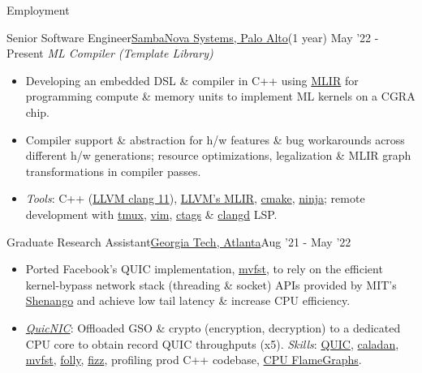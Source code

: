 \documentclass[]{mcdowellcv}
\begin{document}
    \makeheader

    \begin{cvsection}{Employment}
        \begin{cvsubsection}{Senior Software
          Engineer}{\href{https://sambanova.ai/}{SambaNova Systems, Palo
          Alto}}{(1 year) May '22 - Present}
            \textit{ML Compiler (Template Library)}
            \begin{itemize}
                \item Developing an embedded DSL \& compiler in C++ using
                  \href{https://mlir.llvm.org/}{MLIR} for programming compute
                  \& memory units to implement ML kernels on a CGRA chip.
                \item Compiler support \& abstraction for h/w features \& bug workarounds across different h/w generations; resource optimizations, legalization \& MLIR graph transformations in compiler passes.
                \item \textit{Tools}: C++ (\href{https://clang.llvm.org/}{LLVM clang 11}), \href{https://mlir.llvm.org/}{LLVM's MLIR}, \href{https://cmake.org/}{cmake}, \href{https://ninja-build.org/}{ninja};
                    remote development with \href{https://github.com/tmux/tmux}{tmux}, \href{https://www.vim.org/}{vim}, \href{https://github.com/universal-ctags/ctags}{ctags} \& \href{https://clangd.llvm.org/}{clangd} LSP.
            \end{itemize}
        \end{cvsubsection}

        \begin{cvsubsection}{Graduate Research Assistant}{\href{https://scs.gatech.edu/}{Georgia Tech, Atlanta}}{Aug '21 - May '22}
            \begin{itemize}
                \item Ported Facebook's QUIC implementation, \href{https://github.com/facebookincubator/mvfst}{mvfst}, to rely on the efficient kernel-bypass network stack (threading \& socket) APIs provided by MIT's \href{https://www.usenix.org/conference/nsdi19/presentation/ousterhout}{Shenango} and achieve low tail latency \& increase CPU efficiency.
                \item \href{https://github.com/saubhik/caladan/pulls}{\textit{QuicNIC}}: Offloaded GSO \& crypto (encryption, decryption) to a dedicated CPU core to obtain record QUIC throughputs (x5). \textit{Skills}:
                \href{https://quicwg.org/}{QUIC},
                \href{https://github.com/shenango/caladan}{caladan}, \href{https://github.com/facebookincubator/mvfst}{mvfst}, \href{https://github.com/facebook/folly}{folly}, \href{https://github.com/facebookincubator/fizz}{fizz}, profiling prod C++ codebase, \href{https://www.brendangregg.com/FlameGraphs/cpuflamegraphs.html}{CPU FlameGraphs}.
            \end{itemize}
        \end{cvsubsection}


\end{cvsection}
\end{document}
